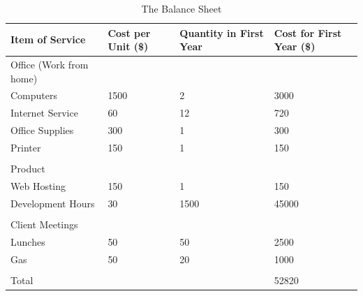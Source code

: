 \begin{table}[ht]
\caption{The Balance Sheet} %
\centering %
\begin{tabular}{| l | p{1in} | p{1in} | p{1in} |} %
\hline
{\bf Item of Service} & {\bf Cost per Unit  (\$)} &  {\bf Quantity in First Year } &  {\bf Cost for First Year (\$) } \\
\hline %
Office (Work from home) & & & \\
Computers & 1500 & 2 & 3000 \\
Internet Service & 60 & 12 & 720 \\
Office Supplies & 300 & 1 & 300 \\
Printer & 150 & 1 & 150 \\
 &   &   &   \\
Product &   &   &   \\
Web Hosting & 150 & 1 & 150 \\
Development Hours & 30 & 1500 & 45000 \\
  &   &   &   \\
Client Meetings &   &   &   \\
Lunches & 50 &  50 & 2500\\
Gas & 50 & 20 & 1000 \\
 &   &  &   \\
Total &   &   & 52820 \\

\hline %
\end{tabular}
\label{balanceSheet} %
\end{table}


